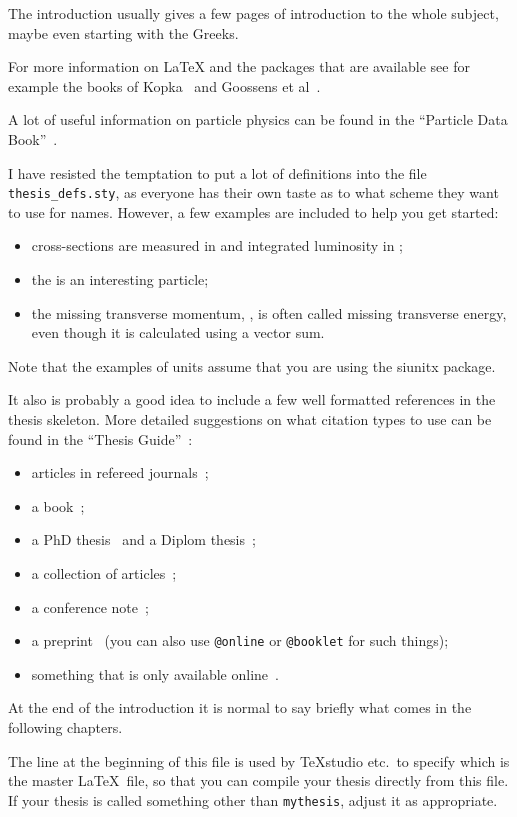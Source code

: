 The introduction usually gives a few pages of introduction to the
whole subject, maybe even starting with the Greeks.

For more information on \LaTeX{} and the packages that are available
see for example the books of Kopka~\cite{kopka04} and Goossens et
al~\cite{goossens04}.

A lot of useful information on particle physics can be found in the
\enquote{Particle Data Book}~\cite{pdg2010}.

I have resisted the temptation to put a lot of definitions into the
file \texttt{thesis\_defs.sty}, as everyone has their own taste as
to what scheme they want to use for names.
However, a few examples are included to help you get started:
\begin{itemize}
\setlength{\itemsep}{0pt}\setlength{\parskip}{0pt}
\item cross-sections are measured in \si{\pb} and integrated
  luminosity in \si{\invpb};
\item the \KoS is an interesting particle;
\item the missing transverse momentum, \pTmiss, is often called
  missing transverse energy, even though it is calculated using a vector sum.
\end{itemize}
Note that the examples of units assume that you are using the
\textsf{siunitx} package.

It also is probably a good idea to include a few well formatted
references in the thesis skeleton. More detailed suggestions on what
citation types to use can be found in the \enquote{Thesis Guide}~\cite{thesis-guide}:
\begin{itemize}
\item articles in refereed journals~\cite{pdg2010,Aad:2010ey};
\item a book~\cite{Halzen:1984mc};
\item a PhD thesis~\cite{tlodd:2012} and a Diplom thesis~\cite{mergelmeyer:2011};
\item a collection of articles~\cite{lhc:vol1};
\item a conference note~\cite{ATLAS-CONF-2011-008};
\item a preprint~\cite{atlas:perf:2009} (you can also use
  \texttt{@online} or \texttt{@booklet} for such things);
\item something that is only available online~\cite{thesis-guide}.
\end{itemize}

At the end of the introduction it is normal to say briefly what comes
in the following chapters.

The line at the beginning of this file is used by TeXstudio etc.\ to
specify which is the master \LaTeX\ file, so that you can compile your thesis
directly from this file.
If your thesis is called something other than \texttt{mythesis}, adjust it as appropriate.
